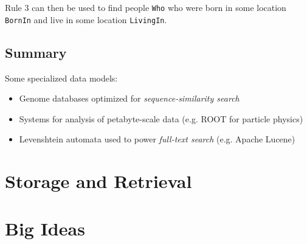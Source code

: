 \documentclass[12pt, titlepage]{article}
\begin{document}
Rule 3 can then be used to find people \texttt{Who} who were born in some location \texttt{BornIn} and live in some location \texttt{LivingIn}.

\subsection{Summary}

Some specialized data models:

\begin{itemize}
    \item Genome databases optimized for \textit{sequence-similarity search}
    \item Systems for analysis of petabyte-scale data (e.g. ROOT for particle physics)
    \item Levenshtein automata used to power \textit{full-text search} (e.g. Apache Lucene)
\end{itemize}

\section{Storage and Retrieval}



\newpage
\appendix

\section{Big Ideas}
\end{document}
